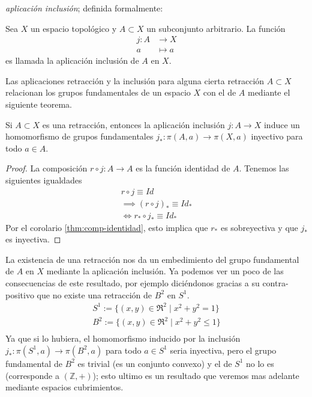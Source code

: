 \emph{aplicación inclusión}; definida formalmente:
\begin{definicion}
  Sea \(X\) un espacio topológico y \(A \subset X\) un subconjunto
  arbitrario. La función
  \begin{align*}
     j : A &\longrightarrow X \\
     a &\longmapsto a
  \end{align*}
  es llamada la aplicación inclusión de \(A\) en \(X\).
\end{definicion}
\noindent Las aplicaciones retracción y la inclusión para alguna cierta
retracción \(A \subset X\) relacionan los grupos fundamentales de un
espacio \(X\) con el de \(A\) mediante el siguiente teorema.
\begin{teorema} \label{thm:retraccion-inclusion}
Si \(A \subset X\) es una retracción, entonces la aplicación inclusión
\(j : A \to X\) induce un homomorfismo de grupos fundamentales \(j_{*} :
\pi(A, a) \to \pi(X,a)\) inyectivo para todo \(a \in A\).
\end{teorema}
\begin{proof}
  La composición \(r \circ j : A \to A\) es la función identidad de
  \(A\). Tenemos las siguientes igualdades
  \begin{gather*}
    r \circ j \equiv Id \\
    \implies (r \circ j)_* \equiv Id_* \\
    \iff r_* \circ j_* \equiv Id_*
  \end{gather*}
  Por el corolario \ref{thm:comp-identidad}, esto implica que \(r_{*}\)
  es sobreyectiva y que \(j_{*}\) es inyectiva.
\end{proof}
La existencia de una retracción nos da un embedimiento del grupo fundamental de
\( A \) en \(X\) mediante la aplicación inclusión. Ya podemos ver un
poco de las consecuencias de este resultado, por ejemplo diciéndonos
gracias a su contra-positivo que no existe una retracción de \(B^2\) en
\(S^1\).
\begin{gather*}
  S^1 := \{ (x,y) \in \Re^2 \mid x^2 + y^2 = 1 \} \\
  B^2 := \{ (x,y) \in \Re^2 \mid x^2 + y^2 \leq 1 \} \\
\end{gather*}
Ya que si lo hubiera, el homomorfismo inducido por la inclusión \(j_* :
\pi (S^1, a) \to \pi (B^2, a)\) para todo \(a \in S^1\) seria
inyectiva, pero el grupo fundamental de \(B^2\) es trivial (es un
conjunto convexo) y el de \(S^1\) no lo es (corresponde a \((\mathbb Z,
+)\)); esto ultimo es un resultado que veremos mas adelante mediante
espacios cubrimientos.

